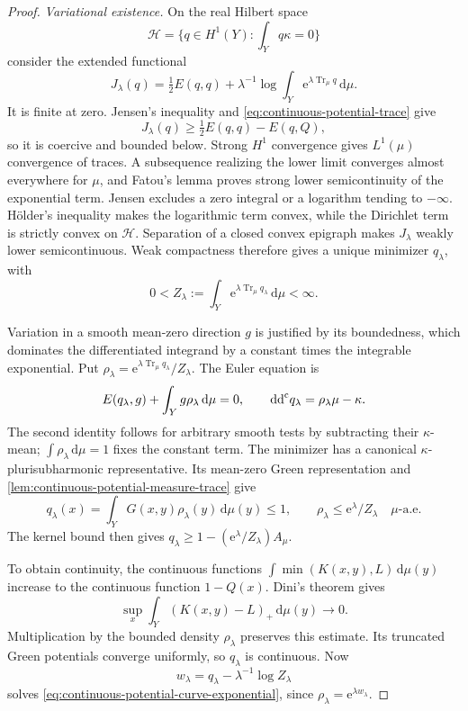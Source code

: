 \begin{proof}
\emph{Variational existence.} On the real Hilbert space
\[
 \mathcal H=\{q\in H^1(Y):\int_Yq\kappa=0\}
\]
consider the extended functional
\[
 J_\lambda(q)=\tfrac12E(q,q)
       +\lambda^{-1}\log\int_Y\mathrm e^{\lambda\operatorname{Tr}_\mu q}\,\mathrm d\mu.
\]
It is finite at zero. Jensen's inequality and \eqref{eq:continuous-potential-trace} give
\[
 J_\lambda(q)\geq\tfrac12E(q,q)-E(q,Q),
\]
so it is coercive and bounded below. Strong $H^1$ convergence gives $L^1(\mu)$ convergence of traces. A subsequence realizing the lower limit converges almost everywhere for $\mu$, and Fatou's lemma proves strong lower semicontinuity of the exponential term. Jensen excludes a zero integral or a logarithm tending to $-\infty$. H\"older's inequality makes the logarithmic term convex, while the Dirichlet term is strictly convex on $\mathcal H$. Separation of a closed convex epigraph makes $J_\lambda$ weakly lower semicontinuous. Weak compactness therefore gives a unique minimizer $q_\lambda$, with
\[
 0<Z_\lambda:=\int_Y\mathrm e^{\lambda\operatorname{Tr}_\mu q_\lambda}\,\mathrm d\mu<\infty.
\]

Variation in a smooth mean-zero direction $g$ is justified by its boundedness, which dominates the differentiated integrand by a constant times the integrable exponential. Put $\rho_\lambda=\mathrm e^{\lambda\operatorname{Tr}_\mu q_\lambda}/Z_\lambda$. The Euler equation is
\[
 E(q_\lambda,g)+\int_Yg\rho_\lambda\,\mathrm d\mu=0,
 \qquad\mathrm{dd}^{\mathrm{c}} q_\lambda=\rho_\lambda\mu-\kappa.
\]
The second identity follows for arbitrary smooth tests by subtracting their $\kappa$-mean; $\int\rho_\lambda\,\mathrm d\mu=1$ fixes the constant term. The minimizer has a canonical $\kappa$-plurisubharmonic representative. Its mean-zero Green representation and \cref{lem:continuous-potential-measure-trace} give
\[
 q_\lambda(x)=\int_YG(x,y)\rho_\lambda(y)\,\mathrm d\mu(y)\leq1,
 \qquad\rho_\lambda\leq\mathrm e^\lambda/Z_\lambda\quad\mu\text{-a.e.}
\]
The kernel bound then gives $q_\lambda\geq1-(\mathrm e^\lambda/Z_\lambda)A_\mu$.

To obtain continuity, the continuous functions $\int\min(K(x,y),L)\,\mathrm d\mu(y)$ increase to the continuous function $1-Q(x)$. Dini's theorem gives
\begin{equation}\label{eq:continuous-potential-uniform-tail}
 \sup_x\int_Y(K(x,y)-L)_+\,\mathrm d\mu(y)\longrightarrow0.
\end{equation}
Multiplication by the bounded density $\rho_\lambda$ preserves this estimate. Its truncated Green potentials converge uniformly, so $q_\lambda$ is continuous. Now
\[
 w_\lambda=q_\lambda-\lambda^{-1}\log Z_\lambda
\]
solves \eqref{eq:continuous-potential-curve-exponential}, since $\rho_\lambda=\mathrm e^{\lambda w_\lambda}$.


\end{proof}
